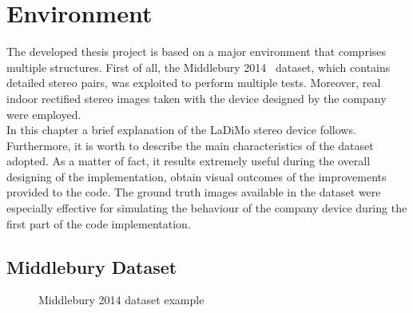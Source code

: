 \chapter{Environment}
\label{chapter:environment}

The developed thesis project is based on a major environment that comprises multiple structures.
First of all, the Middlebury 2014~\cite{Scharstein2014} dataset, which contains detailed stereo pairs, was exploited to perform multiple tests.
Moreover, real indoor rectified stereo images taken with the device designed by the company were employed.\\
In this chapter a brief explanation of the LaDiMo stereo device follows.
Furthermore, it is worth to describe the main characteristics of the dataset adopted.
As a matter of fact, it results extremely useful during the overall designing of the implementation, obtain visual outcomes of the improvements provided to the code.
The ground truth images available in the dataset were especially effective for simulating the behaviour of the company device during the first part of the code implementation.

\section{Middlebury Dataset}
\label{section:middle-dataset}

\begin{figure}[t]
	\centering
\caption{Middlebury 2014 dataset example}
\label{fig:dataset-example}
\end{figure}


